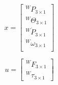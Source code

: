 \documentclass{article}
\begin{document}
\begin{equation}
	x = \begin{bmatrix}
	{}^W P_{3 \times 1}\\
	{}^W\Theta_{3 \times 1}\\
	{}^W\dot{P}_{3 \times 1}\\
	{}^W\omega_{3 \times 1}\\
	\end{bmatrix}
\end{equation}

\begin{equation}
	u = \begin{bmatrix}
	{}^W F_{3 \times 1} \\
	{}^W\tau_{3 \times 1}
	\end{bmatrix}
\end{equation}
\end{document}
